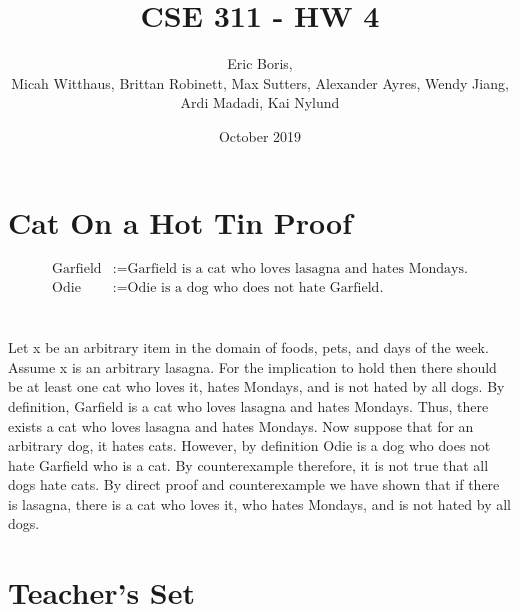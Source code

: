 \documentclass[11pt]{article}
\title{CSE 311 - HW 4}
\author{Eric Boris, \\ Micah Witthaus, Brittan Robinett, Max Sutters, Alexander Ayres, Wendy Jiang, Ardi Madadi, Kai Nylund}
\date{October 2019}
\makeatletter
\renewcommand{\maketitle}{\bgroup\setlength{\parindent}{0pt}
\begin{flushleft}
  \textbf{\@title}

  \@author
  
  \@date
\end{flushleft}\egroup
}
\renewenvironment{proof}[1][\proofname]{\par
  \normalfont \topsep6\p@\@plus6\p@\relax
  \trivlist
  \item[\hskip\labelsep
        \itshape
    #1\@addpunct{.}]\ignorespaces
}{%
  \endtrivlist\@endpefalse
}
\makeatother
\begin{document}
\maketitle

\section{Cat On a Hot Tin Proof} %
\begin{align*}
	\text{Garfield} &:= \text{Garfield is a cat who loves lasagna and hates Mondays.} \\
	\text{Odie} &:= \text{Odie is a dog who does not hate Garfield.} \\
\end{align*}
\begin{proof}[\textbf{Prove:} If there is lasagna there is a cat who loves it, hates Mondays, and who is not hated by all dogs.] \leavevmode \\
	Let x be an arbitrary item in the domain of foods, pets, and days of the week. Assume x is an arbitrary lasagna. For the implication to hold then there should be at least one cat who loves it, hates Mondays, and is not hated by all dogs. By definition, Garfield is a cat who loves lasagna and hates Mondays. Thus, there exists a cat who loves lasagna and hates Mondays. Now suppose that for an arbitrary dog, it hates cats. However, by definition Odie is a dog who does not hate Garfield who is a cat. By counterexample therefore, it is not true that all dogs hate cats. By direct proof and counterexample we have shown that if there is lasagna, there is a cat who loves it, who hates Mondays, and is not hated by all dogs. 
\end{proof}

\section{Teacher's Set} %
\end{document}
